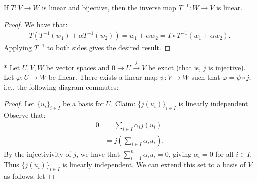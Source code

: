     \begin{proposition}
        If $T:V \rightarrow W$ is linear and bijective, then the inverse map $T^{-1}:W \rightarrow V$ is linear.
    \end{proposition}
        \begin{proof}
            We have that:
                \begin{equation*}
                \begin{split}
                    T(T^{-1}(w_1) + \alpha T^{-1}(w_2)) = w_1 + \alpha w_2 = T \circ T^{-1}(w_1 + \alpha w_2).
                \end{split}
                \end{equation*}
            Applying $T^{-1}$ to both sides gives the desired result.
        \end{proof}

    \begin{proposition}*
        Let $U,V,W$ be vector spaces and $0 \rightarrow U \xrightarrow{j} V$ be exact (that is, $j$ is injective). Let $\varphi:U \rightarrow W$ be linear. There exists a linear map $\psi:V \rightarrow W$ such that $\varphi = \psi\circ j $; i.e., the following diagram commutes:
            \begin{center}
            \end{center}
    \end{proposition}
        \begin{proof}
            Let $\{u_i\}_{i \in I}$ be a basis for $U$. Claim: $\{j(u_i)\}_{i \in I}$ is linearly independent. Observe that:
                \begin{equation*}
                \begin{split}
                    0 
                    & = \sum_{i \in I}\alpha_i j(u_i) \\
                    & = j \left( \sum_{i \in I}\alpha_i u_i \right).
                \end{split}
                \end{equation*}
            By the injectivivity of $j$, we have that $\sum_{i = 1}^n \alpha_i u_i = 0$, giving $\alpha_i = 0$ for all $i \in I$. Thus $\{j(u_i)\}_{i \in I}$ is linearly independent. We can extend this set to a basis of $V$ as follows: let 
        \end{proof}

